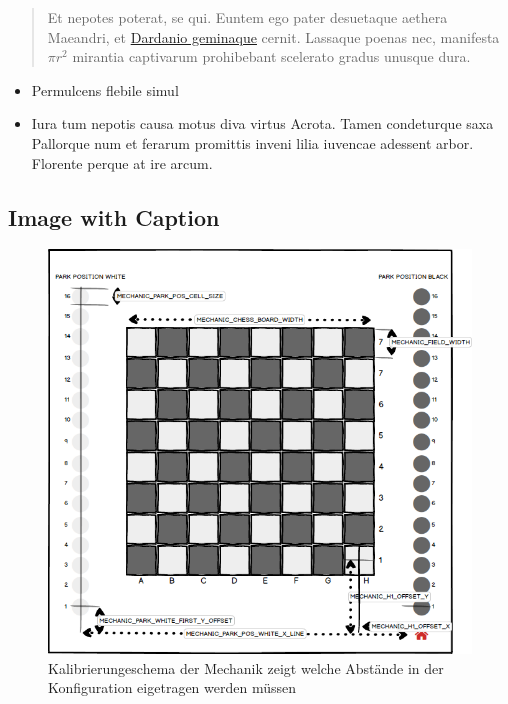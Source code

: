 \begin{quote}
Et nepotes poterat, se qui. Euntem ego pater desuetaque aethera
Maeandri, et \href{http://example.com\#Dardanio_geminaque}{Dardanio
geminaque} cernit. Lassaque poenas nec, manifesta \(\pi r^2\) mirantia
captivarum prohibebant scelerato gradus unusque dura.
\end{quote}

\begin{itemize}
\tightlist
\item
  Permulcens flebile simul
\item
  Iura tum nepotis causa motus diva virtus Acrota. Tamen condeturque
  saxa Pallorque num et ferarum promittis inveni lilia iuvencae adessent
  arbor. Florente perque at ire arcum.
\end{itemize}

\hypertarget{image-with-caption}{%
\subsection{Image with Caption}\label{image-with-caption}}

\begin{figure}
\centering
\includegraphics{images/ATC_Calibration_Guide.png}
\caption{Kalibrierungeschema der Mechanik zeigt welche Abstände in der
Konfiguration eigetragen werden müssen}
\end{figure}
